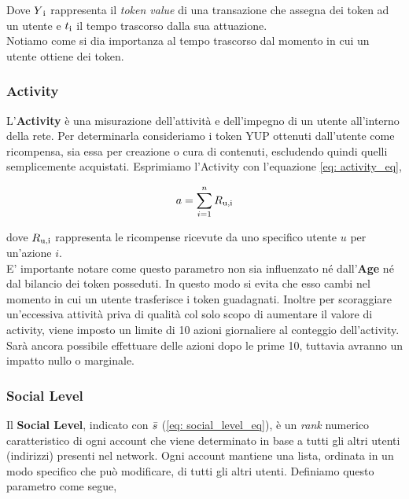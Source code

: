 Dove $Y\textsubscript{i}$ rappresenta il \textit{token value} di una transazione che assegna dei token ad un utente e $t\textsubscript{i}$ il tempo trascorso dalla sua attuazione. 
\\
Notiamo come si dia importanza al tempo trascorso dal momento in cui un utente ottiene dei token.

\subsubsection{Activity}
L'\textbf{Activity} è una misurazione dell'attività e dell'impegno di un utente all'interno della rete. Per determinarla consideriamo i token YUP ottenuti dall'utente come ricompensa, sia essa per creazione o cura di contenuti, escludendo quindi quelli semplicemente acquistati. Esprimiamo l'Activity con l'equazione \ref{eq: activity_eq},

\begin{equation}\label{eq: activity_eq}
    a = \sum\limits_{i=1}^nR\textsubscript{u,i}
\end{equation}

dove $R\textsubscript{u,i}$ rappresenta le ricompense ricevute da uno specifico utente $u$ per un'azione $i$.
\\
E' importante notare come questo parametro non sia influenzato né dall'\textbf{Age} né dal bilancio dei token posseduti. In questo modo si evita che esso cambi nel momento in cui un utente trasferisce i token guadagnati. Inoltre per scoraggiare un'eccessiva attività priva di qualità col solo scopo di aumentare il valore  di activity, viene imposto un limite di 10 azioni giornaliere al conteggio dell'activity. Sarà ancora possibile effettuare delle azioni dopo le prime 10, tuttavia avranno un impatto nullo o marginale.

\subsubsection{Social Level}
Il \textbf{Social Level}, indicato con $\Bar{s}$ (\ref{eq: social_level_eq}), è un \textit{rank} numerico caratteristico di ogni account che viene determinato in base a tutti gli altri utenti (indirizzi) presenti nel network. Ogni account mantiene una lista, ordinata in un modo specifico che può modificare, di tutti gli altri utenti.
Definiamo questo parametro come segue,

